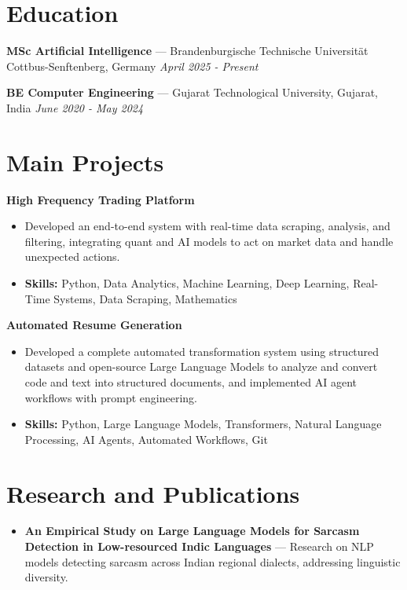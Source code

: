 \documentclass[a4paper,10pt]{article}
\begin{document}
\section*{Education}
\textbf{MSc Artificial Intelligence} — Brandenburgische Technische Universität Cottbus-Senftenberg, Germany \hfill \textit{April 2025 - Present}\par
\vspace{1.5pt}
\textbf{BE Computer Engineering} — Gujarat Technological University, Gujarat, India \hfill \textit{June 2020 - May 2024}\par

\section*{Main Projects}
\textbf{High Frequency Trading Platform}\par
\vspace{1pt}
\begin{itemize}
  \item Developed an end-to-end system with real-time data scraping, analysis, and filtering, integrating quant and AI models to act on market data and handle unexpected actions.
  \item \textbf{Skills:} Python, Data Analytics, Machine Learning, Deep Learning, Real-Time Systems, Data Scraping, Mathematics
\end{itemize}
\vspace{3pt}
\textbf{Automated Resume Generation}\par
\vspace{1pt}
\begin{itemize}
  \item Developed a complete automated transformation system using structured datasets and open-source Large Language Models to analyze and convert code and text into structured documents, and implemented AI agent workflows with prompt engineering.
  \item \textbf{Skills:} Python, Large Language Models, Transformers, Natural Language Processing, AI Agents, Automated Workflows, Git
\end{itemize}

\section*{Research and Publications}
\begin{itemize}
\item \textbf{An Empirical Study on Large Language Models for Sarcasm Detection in Low-resourced Indic Languages} — Research on NLP models detecting sarcasm across Indian regional dialects, addressing linguistic diversity.
\end{itemize}
\end{document}
